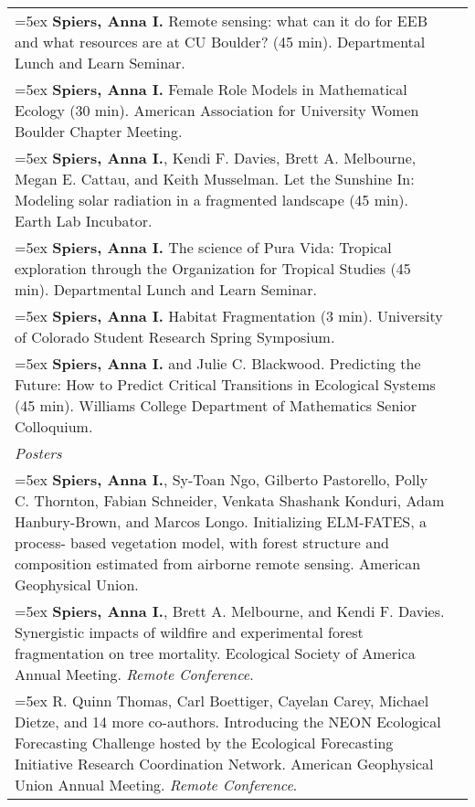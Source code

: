 \begin{longtable}{@{}>{\raggedright}p{5.25in} @{} >{\raggedleft}X@{}}
\hangindent=5ex \textbf{Spiers, Anna I.} Remote sensing: what can it do for EEB and what resources are at CU Boulder? (45 min). Departmental Lunch and Learn Seminar. & 2019 \tabularnewline %

\hangindent=5ex \textbf{Spiers, Anna I.} Female Role Models in Mathematical Ecology (30 min). American Association for University Women Boulder Chapter Meeting. & 2019 \tabularnewline %

\hangindent=5ex \textbf{Spiers, Anna I.}, Kendi F. Davies, Brett A. Melbourne, Megan E. Cattau, and Keith Musselman. Let the Sunshine In: Modeling solar radiation in a fragmented landscape (45 min). Earth Lab Incubator. &  2019 \tabularnewline %

\hangindent=5ex \textbf{Spiers, Anna I.} The science of Pura Vida: Tropical exploration through the Organization for Tropical Studies (45 min). Departmental Lunch and Learn Seminar. &  2019 \tabularnewline %

\hangindent=5ex \textbf{Spiers, Anna I.} Habitat Fragmentation (3 min). University of Colorado Student Research Spring Symposium. & 2018 \tabularnewline %

\hangindent=5ex \textbf{Spiers, Anna I.} and Julie C. Blackwood. Predicting the Future: How to Predict Critical Transitions in Ecological Systems (45 min). Williams College Department of Mathematics Senior Colloquium. & 2014 \tabularnewline %


\emph{Posters}  \tabularnewline

\hangindent=5ex \textbf{Spiers, Anna I.}, Sy-Toan Ngo, Gilberto Pastorello, Polly C. Thornton, Fabian Schneider, Venkata Shashank Konduri, Adam Hanbury-Brown, and Marcos Longo. Initializing ELM-FATES, a process- based vegetation model, with forest structure and composition estimated from airborne remote sensing. American Geophysical Union. &  2023 \tabularnewline %

\hangindent=5ex \textbf{Spiers, Anna I.}, Brett A. Melbourne, and Kendi F. Davies. Synergistic impacts of wildfire and experimental forest fragmentation on tree mortality. Ecological Society of America Annual Meeting. \emph{Remote Conference}. &  2021 \tabularnewline %

\hangindent=5ex R. Quinn Thomas, Carl Boettiger, Cayelan Carey, Michael Dietze, and 14 more co-authors. Introducing the NEON Ecological Forecasting Challenge hosted by the Ecological Forecasting Initiative Research Coordination Network. American Geophysical Union Annual Meeting. \emph{Remote Conference}. & 2020 \tabularnewline %


\end{longtable}
